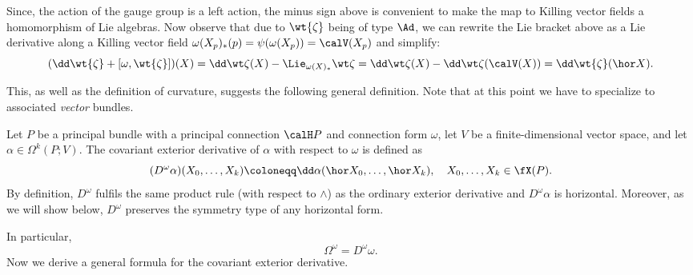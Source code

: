 Since, the action of the gauge group is a left action, the minus sign above is convenient to make the map to Killing vector fields a homomorphism of Lie algebras. Now observe that due to $\wt{\zeta}$ being of type $\Ad$, we can rewrite the Lie bracket above as a Lie derivative along a Killing vector field $\omega(X_p)_\ast(p)=\psi(\omega(X_p))=\calV(X_p)$ and simplify:
\[(\dd\wt{\zeta}+[\omega,\wt{\zeta}])(X)=
\dd\wt\zeta(X)-\Lie_{\omega(X)_\ast}\wt\zeta=
\dd\wt\zeta(X)-\dd\wt\zeta(\calV(X))=\dd\wt{\zeta}(\hor X).\label{eq 4791793}\]

This, as well as the definition of curvature, suggests the following general definition. Note that at this point we have to specialize to associated \emph{vector} bundles.

\begin{defn}
    Let $P$ be a principal bundle with a principal connection $\calH P$ and connection form $\omega$, let $V$ be a finite-dimensional vector space, and let $\alpha\in\Omega^k(P;V)$. The covariant exterior derivative of $\alpha$ with respect to $\omega$ is defined as
    \[(D^\omega \alpha)(X_0,\ldots,X_k)\coloneqq \dd\alpha(\hor X_0,\ldots,\hor X_k),\quad X_0,\ldots,X_k\in\fX(P).\]
    By definition, $D^\omega$ fulfils the same product rule (with respect to $\wedge$) as the ordinary exterior derivative and $D^\omega \alpha$ is horizontal. Moreover, as we will show below, $D^\omega$ preserves the symmetry type of any horizontal form.
\end{defn}

In particular,
\[\Omega^\omega=D^\omega\omega.\]
Now we derive a general formula for the covariant exterior derivative.

